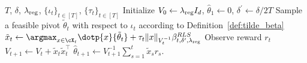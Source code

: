 \begin{algorithm}
	\caption{\POFUL{} }\label{alg:POFUL}
	\begin{algorithmic}
		\REQUIRE $T$, $\delta$, $\lambda_{\text{reg}}$,  $\{\iota_t\}_{t\in [T]}$, $\{\tau_t\}_{t\in [T]}$
		\STATE Initialize $ V_{0} \leftarrow \lambda_{\text{reg}} I_d$, $\widehat{\theta}_{1} \leftarrow 0$,  $\delta^\prime \leftarrow \delta/2T$
		\STATE Sample a feasible pivot $\tilde{\theta}_{t} $ with respect to  $\iota_t$ according to Definition~\ref{def:tilde_beta}
		\STATE $\tilde{x}_{t} \leftarrow \argmax_{x\in\cX_t} \dotp{x}{\tilde{\theta}_{t}}  +   \tau_t  \|x\|_{V^{-1}_t}\beta_{t,\delta^\prime, \lambdareg}^{RLS}$
		\STATE Observe reward $r_{t}$
		\STATE $V_{t+1} \leftarrow V_{t}+\tilde{x}_{t}  \tilde{x}_{t}^{\top}$
		\STATE $\hat{\theta}_{t+1} \leftarrow V_{t+1}^{-1}\sum_{s=1}^{t} \tilde{x}_s r_{s}$.
		\ENDFOR
	\end{algorithmic}
\end{algorithm}


